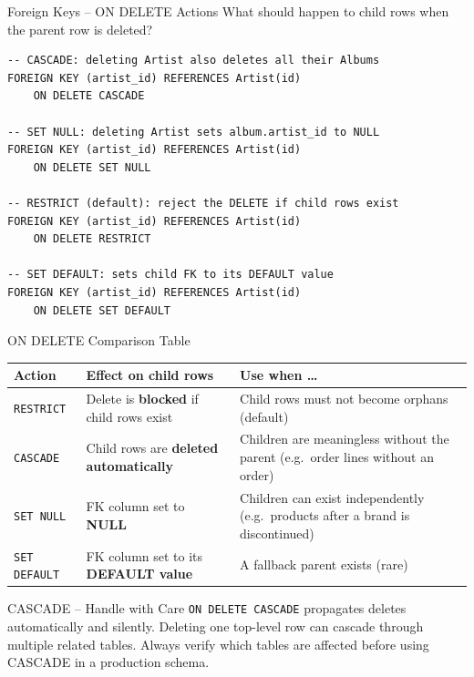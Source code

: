 \begin{frame}[fragile]{Foreign Keys -- ON DELETE Actions}
  What should happen to child rows when the parent row is deleted?

  \begin{lstlisting}[style=sqlstyle]
-- CASCADE: deleting Artist also deletes all their Albums
FOREIGN KEY (artist_id) REFERENCES Artist(id)
    ON DELETE CASCADE

-- SET NULL: deleting Artist sets album.artist_id to NULL
FOREIGN KEY (artist_id) REFERENCES Artist(id)
    ON DELETE SET NULL

-- RESTRICT (default): reject the DELETE if child rows exist
FOREIGN KEY (artist_id) REFERENCES Artist(id)
    ON DELETE RESTRICT

-- SET DEFAULT: sets child FK to its DEFAULT value
FOREIGN KEY (artist_id) REFERENCES Artist(id)
    ON DELETE SET DEFAULT
  \end{lstlisting}
\end{frame}

\begin{frame}{ON DELETE Comparison Table}
  \begin{center}
  \renewcommand{\arraystretch}{1.4}
  \begin{tabularx}{\linewidth}{@{}lXX@{}}
    \toprule
    \textbf{Action} & \textbf{Effect on child rows} & \textbf{Use when \ldots} \\
    \midrule
    \texttt{RESTRICT}   & Delete is \textbf{blocked} if child rows exist & Child rows must not become orphans (default) \\[4pt]
    \texttt{CASCADE}    & Child rows are \textbf{deleted automatically} & Children are meaningless without the parent (e.g.\ order lines without an order) \\[4pt]
    \texttt{SET NULL}   & FK column set to \textbf{NULL}                & Children can exist independently (e.g.\ products after a brand is discontinued) \\[4pt]
    \texttt{SET DEFAULT}& FK column set to its \textbf{DEFAULT value}   & A fallback parent exists (rare) \\
    \bottomrule
  \end{tabularx}
  \end{center}

  \begin{alertblock}{CASCADE -- Handle with Care}
    \texttt{ON DELETE CASCADE} propagates deletes automatically and silently. Deleting one top-level
    row can cascade through multiple related tables. Always verify which tables are affected before
    using CASCADE in a production schema.
  \end{alertblock}
\end{frame}

